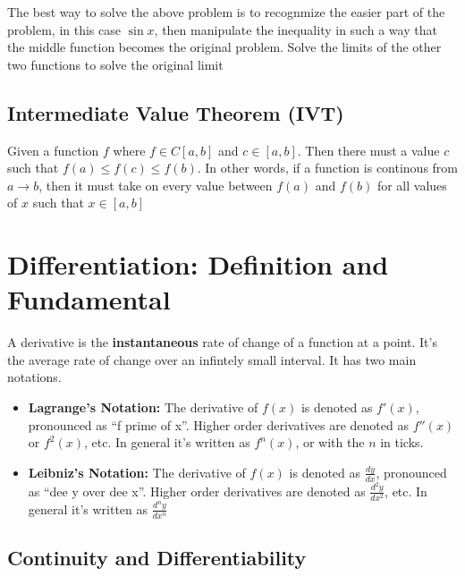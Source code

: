 \documentclass[12pt]{article}
\begin{document}
        The best way to solve the above problem is to recognmize the easier part of the problem, 
        in this case $\sin x$, then manipulate the inequality in such a way that the middle function becomes the 
        original problem. Solve the limits of the other two functions to solve the original limit

        \subsection{Intermediate Value Theorem (IVT)}

        Given a function $f$ where $f \in C[a, b]$ and $c \in [a, b]$. Then there must a value  $c$ such that $f(a) \le f(c) \le f(b)$. In other words, if a 
        function is continous from $a \to b$, then it must take on every value between $f(a)$ and $f(b)$ for all values of $x$ 
        such that $x \in [a, b]$

        \section{Differentiation: Definition and Fundamental}

        A derivative is the \textbf{instantaneous} rate of change of a function at a point. It's the average
        rate of change over an infintely small interval. It has two main notations. 

        \begin{itemize}
            
            \item \textbf{Lagrange's Notation: } The derivative of $f(x)$ is denoted as $f'(x)$, pronounced as ``f prime of x''. 
                                                 Higher order derivatives are denoted as $f''(x)$ or $f^2(x)$, etc. In general it's 
                                                 written as $f^{n}(x)$, or with the $n$ in ticks.

            \item \textbf{Leibniz's Notation: } The derivative of $f(x)$ is denoted as $\frac{dy}{dx}$, pronounced as ``dee y over dee x''. 
                                                Higher order derivatives are denoted as $\frac{d^2y}{dx^2}$, etc. In general it's 
                                                written as $\frac{d^ny}{dx^n}$

        \end{itemize}

        \subsection{Continuity and Differentiability}
\end{document}
